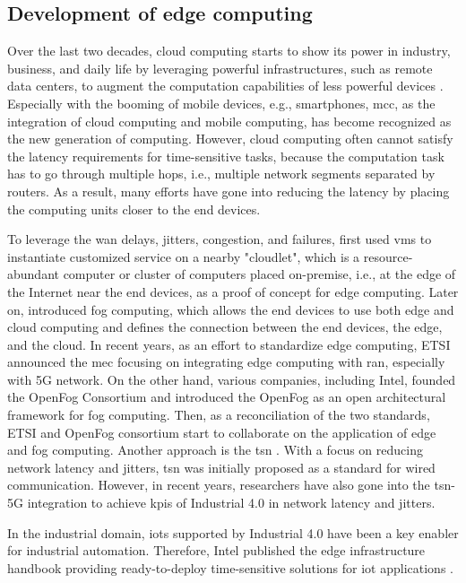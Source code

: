 \subsection{Development of edge computing}

Over the last two decades, cloud computing starts to show its power in industry, business, and daily life by leveraging powerful infrastructures, such as remote data centers, to augment the computation capabilities of less powerful devices \cite{Lin2019}. Especially with the booming of mobile devices, e.g., smartphones, \gls{mcc}, as the integration of cloud computing and mobile computing, has become recognized as the new generation of computing. However, cloud computing often cannot satisfy the latency requirements for time-sensitive tasks, because the computation task has to go through multiple hops, i.e., multiple network segments separated by routers. As a result, many efforts have gone into reducing the latency by placing the computing units closer to the end devices. 

To leverage the \gls{wan} delays, jitters, congestion, and failures, \citeauthor*{Satyanarayanan2009} \cite{Satyanarayanan2009} first used \glspl{vm} to instantiate customized service on a nearby "cloudlet", which is a resource-abundant computer or cluster of computers placed on-premise, i.e., at the edge of the Internet near the end devices, as a proof of concept for edge computing. Later on, \citeauthor*{Bonomi2012} \cite{Bonomi2012} introduced fog computing, which allows the end devices to use both edge and cloud computing and defines the connection between the end devices, the edge, and the cloud. In recent years, as an effort to standardize edge computing, ETSI \cite{Kekki2018} announced the \gls{mec} focusing on integrating edge computing with \gls{ran}, especially with 5G network. On the other hand, various companies, including Intel, founded the OpenFog Consortium and introduced the OpenFog as an open architectural framework for fog computing. Then, as a reconciliation of the two standards, ETSI and OpenFog consortium start to collaborate on the application of edge and fog computing. Another approach is the \gls{tsn} \cite{Satka2023}. With a focus on reducing network latency and jitters, \gls{tsn} was initially proposed as a standard for wired communication. However, in recent years, researchers have also gone into the \gls{tsn}-5G integration to achieve \glspl{kpi} of Industrial 4.0 in network latency and jitters. 

In the industrial domain, \glspl{iot} supported by Industrial 4.0 have been a key enabler for industrial automation. Therefore, Intel published the edge infrastructure handbook providing ready-to-deploy time-sensitive solutions for \gls{iot} applications \cite{intel-edge-2021}. 

